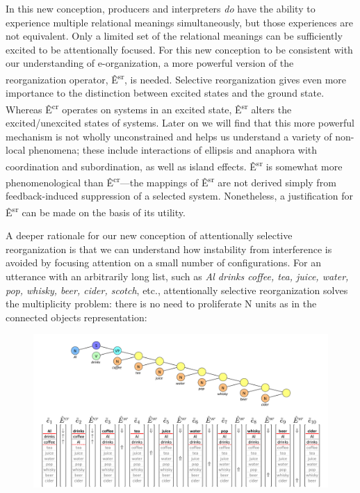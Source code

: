   In this new conception, producers and interpreters \textit{do} have the ability to experience multiple relational meanings simultaneously, but those experiences are not equivalent. Only a limited set of the relational meanings can be sufficiently excited to be attentionally focused. For this new conception to be consistent with our understanding of e-organization, a more powerful version of the reorganization operator, Ê\textsuperscript{sr},  is needed. Selective reorganization gives even more importance to the distinction between excited states and the ground state. Whereas Ê\textsuperscript{cr} operates on systems in an excited state, Ê\textsuperscript{sr} alters the excited/unexcited states of systems. Later on we will find that this more powerful mechanism is not wholly unconstrained and helps us understand a variety of non-local phenomena; these include interactions of ellipsis and anaphora with coordination and subordination, as well as island effects. Ê\textsuperscript{sr} is somewhat more phenomenological than Ê\textsuperscript{cr}—the mappings of Ê\textsuperscript{sr} are not derived simply from feedback-induced suppression of a selected system. Nonetheless, a justification for Ê\textsuperscript{sr} can be made on the basis of its utility.

  A deeper rationale for our new conception of attentionally selective reorganization is that we can understand how instability from interference is avoided by focusing attention on a small number of configurations.  For an utterance with an arbitrarily long list, such as \textit{Al drinks coffee, tea, juice, water, pop, whisky, beer, cider, scotch}, etc., attentionally selective reorganization solves the multiplicity problem: there is no need to proliferate N units as in the connected objects representation: 

  
\begin{figure}
\includegraphics[width=\textwidth]{figures/Tilsen-img104.png}
\caption{\missingcaption}
\label{fig:}
\end{figure}
 

